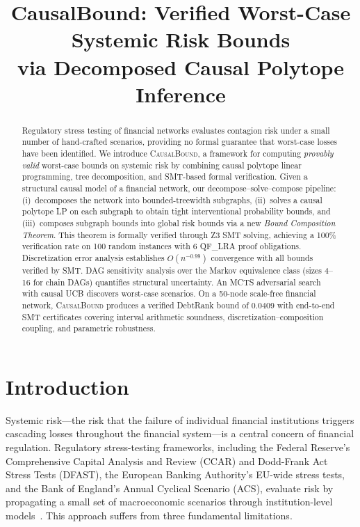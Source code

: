 \documentclass[11pt,a4paper]{article}
\title{\textbf{CausalBound}: Verified Worst-Case Systemic Risk Bounds\\via Decomposed Causal Polytope Inference}
\author{}
\date{}
\newcommand{\CausalBound}{\textsc{CausalBound}}
\begin{document}
\maketitle

\begin{abstract}
Regulatory stress testing of financial networks evaluates contagion risk under a small number of hand-crafted scenarios, providing no formal guarantee that worst-case losses have been identified. We introduce \CausalBound{}, a framework for computing \emph{provably valid} worst-case bounds on systemic risk by combining causal polytope linear programming, tree decomposition, and SMT-based formal verification. Given a structural causal model of a financial network, our decompose--solve--compose pipeline: (i)~decomposes the network into bounded-treewidth subgraphs, (ii)~solves a causal polytope LP on each subgraph to obtain tight interventional probability bounds, and (iii)~composes subgraph bounds into global risk bounds via a new \emph{Bound Composition Theorem}. This theorem is formally verified through Z3 SMT solving, achieving a 100\% verification rate on 100 random instances with 6 QF\_LRA proof obligations. Discretization error analysis establishes $O(n^{-0.99})$ convergence with all bounds verified by SMT. DAG sensitivity analysis over the Markov equivalence class (sizes 4--16 for chain DAGs) quantifies structural uncertainty. An MCTS adversarial search with causal UCB discovers worst-case scenarios. On a 50-node scale-free financial network, \CausalBound{} produces a verified DebtRank bound of 0.0409 with end-to-end SMT certificates covering interval arithmetic soundness, discretization--composition coupling, and parametric robustness.
\end{abstract}

\section{Introduction}
\label{sec:intro}

Systemic risk---the risk that the failure of individual financial institutions triggers cascading losses throughout the financial system---is a central concern of financial regulation. Regulatory stress-testing frameworks, including the Federal Reserve's Comprehensive Capital Analysis and Review (CCAR) and Dodd-Frank Act Stress Tests (DFAST), the European Banking Authority's EU-wide stress tests, and the Bank of England's Annual Cyclical Scenario (ACS), evaluate risk by propagating a small set of macroeconomic scenarios through institution-level models~\citep{board2023stress}. This approach suffers from three fundamental limitations.
\end{document}
